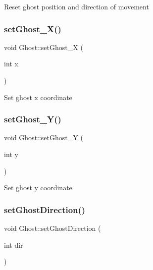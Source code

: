 Reset ghost position and direction of movement \mbox{\label{class_ghost_a1f3b792655f805a40ebadd5651d0aa2a}} 
\subsubsection{\texorpdfstring{set\+Ghost\+\_\+\+X()}{setGhost\_X()}}
{\footnotesize\ttfamily void Ghost\+::set\+Ghost\+\_\+X (\begin{DoxyParamCaption}\item[{int}]{x }\end{DoxyParamCaption})\hspace{0.3cm}{\ttfamily [inline]}}

Set ghost x coordinate \mbox{\label{class_ghost_add5ef21063781debb4568305fd765162}} 
\subsubsection{\texorpdfstring{set\+Ghost\+\_\+\+Y()}{setGhost\_Y()}}
{\footnotesize\ttfamily void Ghost\+::set\+Ghost\+\_\+Y (\begin{DoxyParamCaption}\item[{int}]{y }\end{DoxyParamCaption})\hspace{0.3cm}{\ttfamily [inline]}}

Set ghost y coordinate \mbox{\label{class_ghost_a021a76713a5fdf501fd601d8644002bb}} 
\subsubsection{\texorpdfstring{set\+Ghost\+Direction()}{setGhostDirection()}}
{\footnotesize\ttfamily void Ghost\+::set\+Ghost\+Direction (\begin{DoxyParamCaption}\item[{int}]{dir }\end{DoxyParamCaption})\hspace{0.3cm}{\ttfamily [inline]}}

